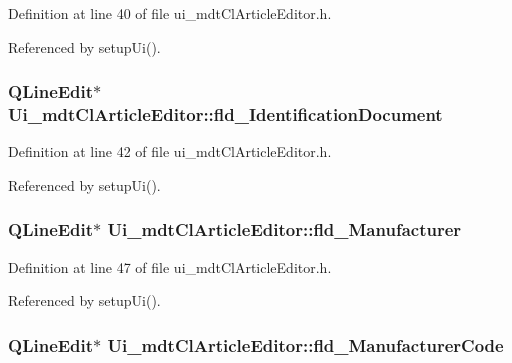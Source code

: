Definition at line 40 of file ui\-\_\-mdt\-Cl\-Article\-Editor.\-h.



Referenced by setup\-Ui().

\hypertarget{class_ui__mdt_cl_article_editor_a8e28dd55d25f1e2b0fa14985b36884ce}{
\subsubsection[{fld\-\_\-\-Identification\-Document}]{\setlength{\rightskip}{0pt plus 5cm}Q\-Line\-Edit$\ast$ Ui\-\_\-mdt\-Cl\-Article\-Editor\-::fld\-\_\-\-Identification\-Document}}\label{class_ui__mdt_cl_article_editor_a8e28dd55d25f1e2b0fa14985b36884ce}


Definition at line 42 of file ui\-\_\-mdt\-Cl\-Article\-Editor.\-h.



Referenced by setup\-Ui().

\hypertarget{class_ui__mdt_cl_article_editor_a4386172547c12e054a0d72b08c240d19}{
\subsubsection[{fld\-\_\-\-Manufacturer}]{\setlength{\rightskip}{0pt plus 5cm}Q\-Line\-Edit$\ast$ Ui\-\_\-mdt\-Cl\-Article\-Editor\-::fld\-\_\-\-Manufacturer}}\label{class_ui__mdt_cl_article_editor_a4386172547c12e054a0d72b08c240d19}


Definition at line 47 of file ui\-\_\-mdt\-Cl\-Article\-Editor.\-h.



Referenced by setup\-Ui().

\hypertarget{class_ui__mdt_cl_article_editor_ae1e1fcfc8515251d4395b4909292ca10}{
\subsubsection[{fld\-\_\-\-Manufacturer\-Code}]{\setlength{\rightskip}{0pt plus 5cm}Q\-Line\-Edit$\ast$ Ui\-\_\-mdt\-Cl\-Article\-Editor\-::fld\-\_\-\-Manufacturer\-Code}}\label{class_ui__mdt_cl_article_editor_ae1e1fcfc8515251d4395b4909292ca10}


